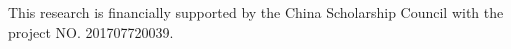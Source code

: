 This research is financially supported by the China Scholarship Council with the project NO. 201707720039.